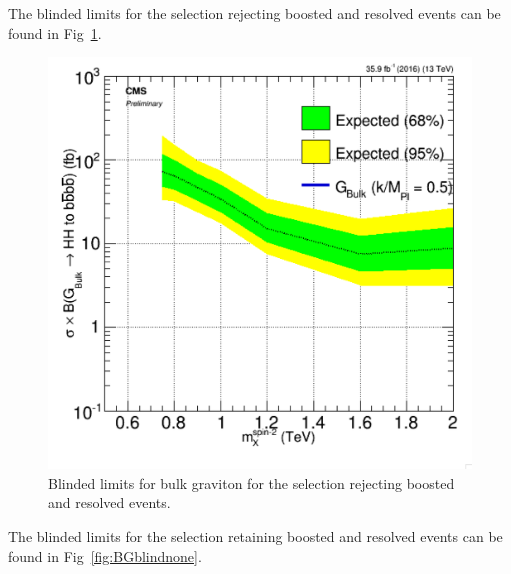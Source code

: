 The blinded limits for the selection rejecting boosted and resolved events can be found in Fig~\ref{fig:BGblindboth}.

\begin{figure}[thb!]
\begin{center}
\includegraphics[scale=0.5]{Figures/brazflag_BG_both_v2.pdf}
\end{center}
\caption{Blinded limits for bulk graviton for the selection rejecting boosted and resolved events.}
\label{fig:BGblindboth}
\end{figure} 

The blinded limits for the selection retaining boosted and resolved events can be found in Fig~\ref{fig:BGblindnone}.

